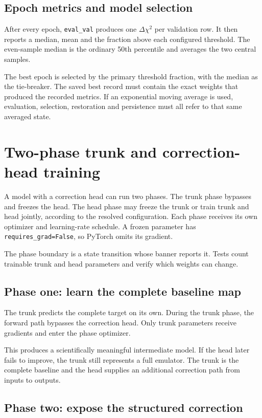 \documentclass[10pt,aps,prd,twocolumn,nofootinbib]{revtex4-2}
\newcommand{\code}[1]{\texttt{#1}}
\begin{document}
\subsection{Epoch metrics and model selection}

After every epoch, \code{eval\_val} produces one $\Delta\chi^2$ per validation
row.  It then reports a median, mean and the fraction above each configured
threshold.  The even-sample median is the ordinary 50th percentile and averages
the two central samples.

The best epoch is selected by the primary threshold fraction, with the median
as the tie-breaker.  The saved best record must contain the exact weights that
produced the recorded metrics.  If an exponential moving average is used,
evaluation, selection, restoration and persistence must all refer to that
same averaged state.

\section{Two-phase trunk and correction-head training}
\label{sec:two-phase}

A model with a correction head can run two phases.  The trunk phase bypasses
and freezes the head.  The head phase may freeze the trunk or train trunk and
head jointly, according to the resolved configuration.  Each phase receives
its own optimizer and learning-rate schedule.  A frozen parameter has
\code{requires\_grad=False}, so PyTorch omits its gradient.

The phase boundary is a state transition whose banner reports it.  Tests count
trainable trunk and head parameters and verify which weights can change.

\subsection{Phase one: learn the complete baseline map}

The trunk predicts the complete target on its own.  During the trunk phase,
the forward path bypasses the correction head.  Only trunk parameters receive
gradients and enter the phase optimizer.

This produces a scientifically meaningful intermediate model.  If the head
later fails to improve, the trunk still represents a full emulator.  The
trunk is the complete baseline and the head supplies an additional correction
path from inputs to outputs.

\subsection{Phase two: expose the structured correction}
\end{document}
